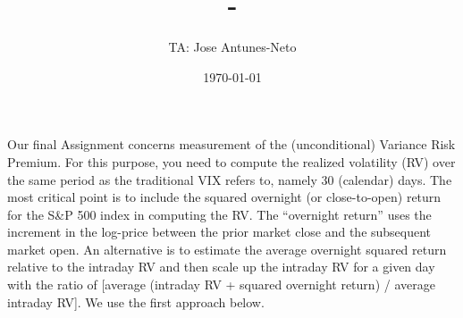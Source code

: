 \documentclass[12pt,twoside]{article}
\title{\course-\assignment}
\author{TA: Jose Antunes-Neto}
\date{\today}
\begin{document}
\maketitle

Our final Assignment concerns measurement of the (unconditional) Variance Risk Premium. For this purpose, you need to compute the realized volatility (RV) over the same period as the traditional VIX refers to, namely 30 (calendar) days. The most critical point is to include the squared overnight (or close-to-open) return for the S\&P 500 index in computing the RV. The ``overnight return” uses the increment in the log-price between the prior market close and the subsequent market open. An alternative is to estimate the average overnight squared return relative to the intraday RV and then scale up the intraday RV for a given day with the ratio of [average (intraday RV + squared overnight return) / average intraday RV]. We use the first approach below.
\end{document}

